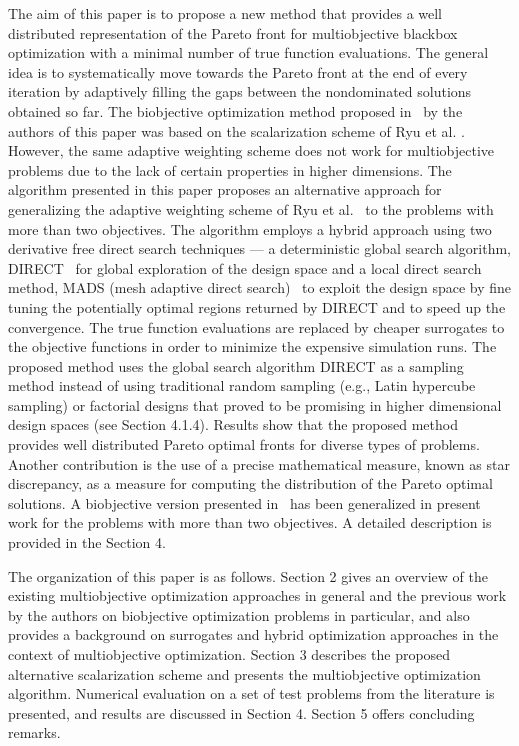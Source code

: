 The aim of this paper is to propose a new method that provides a well 
distributed representation of the Pareto front for multiobjective blackbox 
optimization with a minimal number of true function evaluations. 
The general idea is to systematically move towards the Pareto front at the end
of every iteration by adaptively filling the gaps between the nondominated
solutions obtained so far. The biobjective optimization method proposed in
\DWC\ by the authors of this paper was based on the scalarization scheme of Ryu
et al. \RKW. However, the same adaptive weighting scheme does not work for
multiobjective problems due to the lack of certain properties in higher
dimensions. The algorithm presented in this paper proposes an alternative
approach for generalizing the adaptive weighting scheme of Ryu et al. \RKW\ to
the problems with more than two objectives. The algorithm employs a hybrid
approach using two derivative free direct search techniques --- a deterministic
global search algorithm, DIRECT \JPS\ for global exploration of the design
space and a local direct search method, MADS (mesh adaptive direct search) \AD\
to exploit the design space by fine tuning the potentially optimal regions
returned by DIRECT and to speed up the convergence.  The true function
evaluations are replaced by cheaper surrogates to the objective
functions in order to minimize the expensive simulation runs. The proposed 
method uses the global search algorithm DIRECT as a sampling
method instead of using traditional random sampling (e.g., Latin hypercube 
sampling) or factorial designs that  proved to be promising in higher dimensional 
design spaces (see Section 4.1.4). Results show that the proposed method provides 
well distributed Pareto optimal fronts for diverse types of problems. 
Another contribution is the use of a precise mathematical measure, known 
as star discrepancy, as a measure for computing the distribution of the 
Pareto optimal solutions. A biobjective version presented in \DWC\ has been 
generalized in present work for the problems with more than two objectives. A
detailed description is provided in the Section 4.  

The organization of this paper is as follows. Section 2 gives an overview  
of the existing multiobjective optimization approaches in general and the 
previous work by the authors on biobjective optimization problems in particular, 
and also provides a background on surrogates and hybrid optimization approaches 
in the context of multiobjective optimization. Section 3 describes the proposed  
alternative scalarization scheme and presents the multiobjective optimization 
algorithm. Numerical evaluation on a set of test problems from the literature 
is presented, and results are discussed in Section 4. Section 5 offers 
concluding remarks.
 
